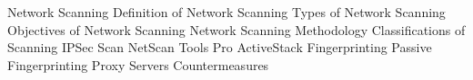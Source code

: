 Network Scanning
	Definition of Network Scanning
	Types of Network Scanning
	Objectives of Network Scanning
	Network Scanning Methodology
	Classifications of Scanning
	IPSec Scan
	NetScan Tools Pro
	ActiveStack Fingerprinting
		Passive Fingerprinting
	Proxy Servers
	Countermeasures